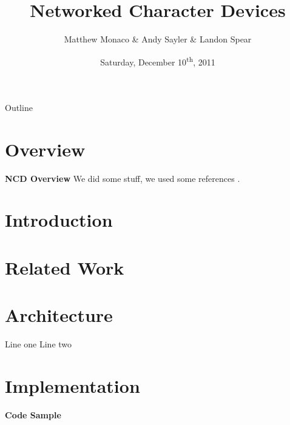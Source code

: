 \documentclass[xcolor=dvipsnames]{beamer}
\title[NCD]{Networked Character Devices}
\author[Monaco, Sayler, Spear]{Matthew Monaco \&
                               Andy Sayler \&
                               Landon Spear}
\institute[CU-Boulder]{
  University of Colorado at Boulder \\
  \texttt{\{first.last\}@colorado.edu}
}
\date[Dec. 10, 2011]{Saturday, December 10\textsuperscript{th}, 2011}
\begin{document}
\begin{frame}[plain]
  \titlepage
\end{frame}

\begin{frame}{Outline}
  \tableofcontents
\end{frame}


\section{Overview}
\begin{frame}{\bf NCD Overview}
  We did some stuff, we used some references \cite{ldd3}.
\end{frame}

\section{Introduction}

\section{Related Work}


\section{Architecture}

\begin{frame}
Line one
\pause
Line two
\end{frame}

\section{Implementation}

\begin{frame}{\bf Code Sample}
  


\end{frame}


\end{document}
